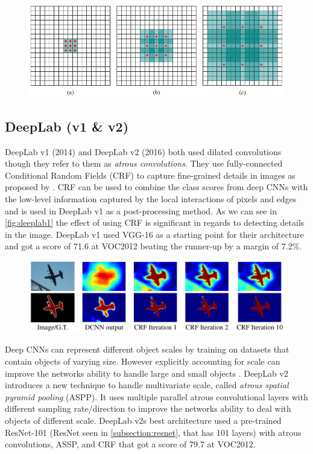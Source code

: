 \begin{figure}[H]
	\centering
	\includegraphics[width=0.7\linewidth]{fig/dilution.png}
	\label{fig:dilution}
\end{figure}


\subsection{DeepLab (v1 \& v2)}
DeepLab v1 (2014) \citet{Chen2014} and DeepLab v2 (2016) \citet{Chen2016} both used dilated convolutions though they refer to them as \emph{atrous convolutions}. They use fully-connected Conditional Random Fields (CRF) to capture fine-grained details in images as proposed by \citet{Krahenbuhl2012a}. CRF can be used to combine the class scores from deep CNNs with the low-level information captured by the local interactions of pixels and edges \citet{Chen2014} and is used in DeepLab v1 as a post-processing method. As we can see in \autoref{fig:deeplab1} the effect of using CRF is significant in regards to detecting details in the image. DeepLab v1 used VGG-16 as a starting point for their architecture and got a score of 71.6 at VOC2012 beating the runner-up by a margin of 7.2\%. 

\begin{figure}[H]
	\centering
	\includegraphics[width=0.7\linewidth]{fig/deeplab1.png}
	\label{fig:deeplab1}
\end{figure}


Deep CNNs can represent different object scales by training on datasets that contain objects of varying size. However explicitly accounting for scale can improve the networks ability to handle large and small objects \citet{Papandreou2015}. DeepLab v2 introduces a new technique to handle multivariate scale, called \emph{atrous spatial pyramid pooling} (ASPP). It uses multiple parallel atrous convolutional layers with different sampling rate/direction to improve the networks ability to deal with objects of different scale. DeepLab v2s best architecture used a pre-trained ResNet-101 (ResNet seen in \autoref{subsection:resnet}, that has 101 layers) with atrous convolutions, ASSP, and CRF that got a score of 79.7 at VOC2012.


